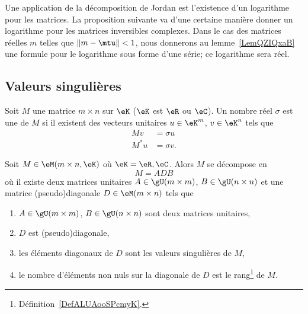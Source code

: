 Une application de la décomposition de Jordan est l'existence d'un logarithme pour les matrices. La proposition suivante va d'une certaine manière donner un logarithme pour les matrices inversibles complexes. Dans le cas des matrices réelles \( m\) telles que \( \| m-\mtu \|<1\), nous donnerons au lemme~\ref{LemQZIQxaB} une formule pour le logarithme sous forme d'une série; ce logarithme sera réel.

\subsection{Valeurs singulières}

\begin{definition}
    Soit \( M\) une matrice \( m\times n\) sur \( \eK\) (\( \eK\) est \( \eR\) ou \( \eC\)). Un nombre réel \( \sigma\) est une  de \( M\) si il existent des vecteurs unitaires \( u\in \eK^m\), \( v\in \eK^n\) tels que
    \begin{subequations}
        \begin{align}
            Mv&=\sigma u\\
            M^*u&=\sigma v.
        \end{align}
    \end{subequations}
\end{definition}

\begin{theorem}
    Soit \( M\in \eM(m\times n,\eK)\) où \( \eK=\eR,\eC\). Alors \( M\) se décompose en
    \begin{equation}
        M=ADB
    \end{equation}
    où
    il existe deux matrices unitaires \( A\in \gU(m\times m)\), \( B\in \gU(n\times n)\) et une matrice (pseudo)diagonale \( D\in \eM(m\times n)\) tels que
    \begin{enumerate}
        \item
            \( A\in\gU(m\times m)\), \( B\in\gU(n\times n)\) sont deux matrices unitaires,
        \item
            \( D\) est (pseudo)diagonale,
        \item
            les éléments diagonaux de \( D\) sont les valeurs singulières de \( M\),
        \item
            le nombre d'éléments non nuls sur la diagonale de \( D\) est le rang\footnote{Définition~\ref{DefALUAooSPcmyK}.} de \( M\).
    \end{enumerate}
\end{theorem}

